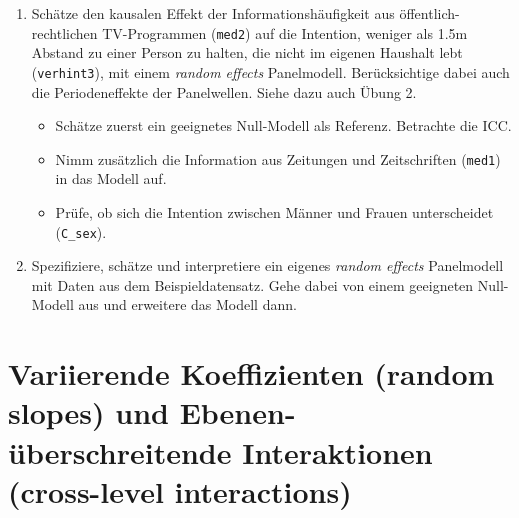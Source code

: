 \documentclass[
]{book}
\providecommand{\tightlist}{%
  \setlength{\itemsep}{0pt}\setlength{\parskip}{0pt}}
\begin{document}
\begin{enumerate}
\def\labelenumi{\arabic{enumi})}
\tightlist
\item
  Schätze den kausalen Effekt der Informationshäufigkeit aus öffentlich-rechtlichen TV-Programmen (\texttt{med2}) auf die Intention, weniger als 1.5m Abstand zu einer Person zu halten, die nicht im eigenen Haushalt lebt (\texttt{verhint3}), mit einem \emph{random effects} Panelmodell. Berücksichtige dabei auch die Periodeneffekte der Panelwellen. Siehe dazu auch Übung 2.

  \begin{itemize}
  \tightlist
  \item
    Schätze zuerst ein geeignetes Null-Modell als Referenz. Betrachte die ICC.
  \item
    Nimm zusätzlich die Information aus Zeitungen und Zeitschriften (\texttt{med1}) in das Modell auf.
  \item
    Prüfe, ob sich die Intention zwischen Männer und Frauen unterscheidet (\texttt{C\_sex}).
  \end{itemize}
\item
  Spezifiziere, schätze und interpretiere ein eigenes \emph{random effects} Panelmodell mit Daten aus dem Beispieldatensatz. Gehe dabei von einem geeigneten Null-Modell aus und erweitere das Modell dann.
\end{enumerate}

\hypertarget{variierende-koeffizienten-random-slopes-und-ebenen-uxfcberschreitende-interaktionen-cross-level-interactions}{%
\section{Variierende Koeffizienten (random slopes) und Ebenen-überschreitende Interaktionen (cross-level interactions)}\label{variierende-koeffizienten-random-slopes-und-ebenen-uxfcberschreitende-interaktionen-cross-level-interactions}}
\end{document}
